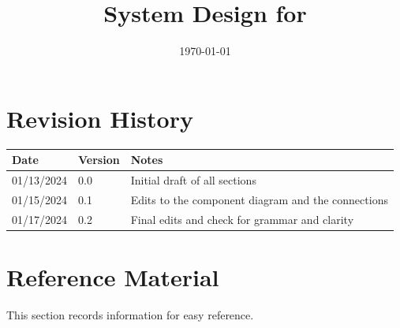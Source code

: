 \documentclass[12pt, titlepage]{article}
\begin{document}
\title{System Design for \progname{}} 
\author{\authname}
\date{\today}

\maketitle


\section{Revision History}

\begin{tabularx}{\textwidth}{p{3cm}p{2cm}X}
\toprule {\bf Date} & {\bf Version} & {\bf Notes}\\
\midrule
01/13/2024 & 0.0 & Initial draft of all sections\\
01/15/2024 & 0.1 & Edits to the component diagram and the connections\\
01/17/2024 & 0.2 & Final edits and check for grammar and clarity \\
\bottomrule
\end{tabularx}

\newpage

\section{Reference Material}

This section records information for easy reference.
\end{document}
